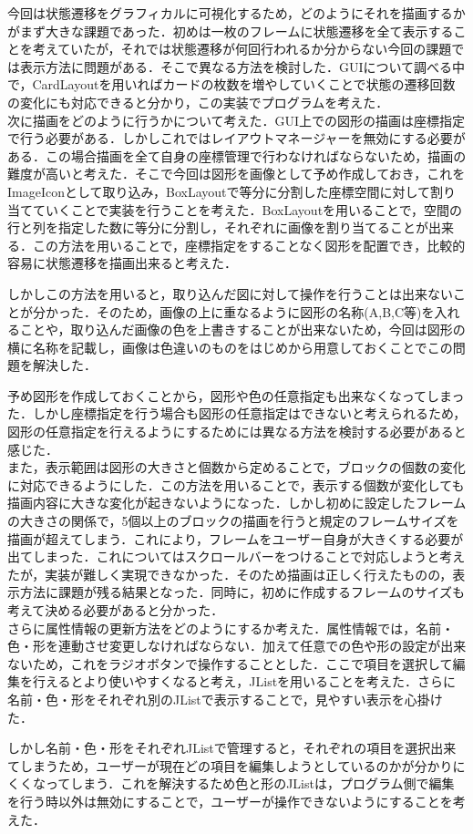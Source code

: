 \documentclass[12pt]{jarticle}
\begin{document}
今回は状態遷移をグラフィカルに可視化するため，どのようにそれを描画するかがまず大きな課題であった．初めは一枚のフレームに状態遷移を全て表示することを考えていたが，それでは状態遷移が何回行われるか分からない今回の課題では表示方法に問題がある．そこで異なる方法を検討した．GUIについて調べる中で，CardLayoutを用いればカードの枚数を増やしていくことで状態の遷移回数の変化にも対応できると分かり，この実装でプログラムを考えた．\\

次に描画をどのように行うかについて考えた．GUI上での図形の描画は座標指定で行う必要がある．しかしこれではレイアウトマネージャーを無効にする必要がある．この場合描画を全て自身の座標管理で行わなければならないため，描画の難度が高いと考えた．そこで今回は図形を画像として予め作成しておき，これをImageIconとして取り込み，BoxLayoutで等分に分割した座標空間に対して割り当てていくことで実装を行うことを考えた．BoxLayoutを用いることで，空間の行と列を指定した数に等分に分割し，それぞれに画像を割り当てることが出来る．この方法を用いることで，座標指定をすることなく図形を配置でき，比較的容易に状態遷移を描画出来ると考えた．\par
しかしこの方法を用いると，取り込んだ図に対して操作を行うことは出来ないことが分かった．そのため，画像の上に重なるように図形の名称(A,B,C等)を入れることや，取り込んだ画像の色を上書きすることが出来ないため，今回は図形の横に名称を記載し，画像は色違いのものをはじめから用意しておくことでこの問題を解決した．\par
予め図形を作成しておくことから，図形や色の任意指定も出来なくなってしまった．しかし座標指定を行う場合も図形の任意指定はできないと考えられるため，図形の任意指定を行えるようにするためには異なる方法を検討する必要があると感じた．\\

また，表示範囲は図形の大きさと個数から定めることで，ブロックの個数の変化に対応できるようにした．この方法を用いることで，表示する個数が変化しても描画内容に大きな変化が起きないようになった．しかし初めに設定したフレームの大きさの関係で，5個以上のブロックの描画を行うと規定のフレームサイズを描画が超えてしまう．これにより，フレームをユーザー自身が大きくする必要が出てしまった．これについてはスクロールバーをつけることで対応しようと考えたが，実装が難しく実現できなかった．そのため描画は正しく行えたものの，表示方法に課題が残る結果となった．同時に，初めに作成するフレームのサイズも考えて決める必要があると分かった．\\

さらに属性情報の更新方法をどのようにするか考えた．属性情報では，名前・色・形を連動させ変更しなければならない．加えて任意での色や形の設定が出来ないため，これをラジオボタンで操作することとした．ここで項目を選択して編集を行えるとより使いやすくなると考え，JListを用いることを考えた．さらに名前・色・形をそれぞれ別のJListで表示することで，見やすい表示を心掛けた．\par
しかし名前・色・形をそれぞれJListで管理すると，それぞれの項目を選択出来てしまうため，ユーザーが現在どの項目を編集しようとしているのかが分かりにくくなってしまう．これを解決するため色と形のJListは，プログラム側で編集を行う時以外は無効にすることで，ユーザーが操作できないようにすることを考えた．\\
\end{document}
